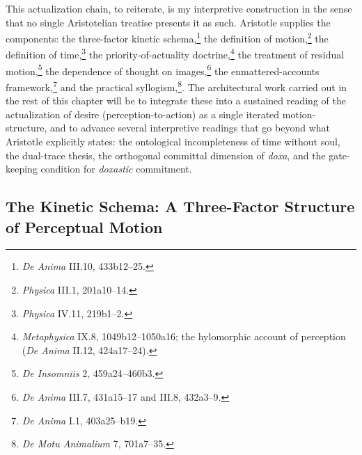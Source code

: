 \documentclass{article}
\begin{document}
This actualization chain, to reiterate, is my interpretive construction in the sense that no single Aristotelian treatise presents it as such. Aristotle supplies the components: the three-factor kinetic schema,\footnote{\textit{De Anima} III.10, 433b12--25.} the definition of motion,\footnote{\textit{Physica} III.1, 201a10--14.} the definition of time,\footnote{\textit{Physica} IV.11, 219b1--2.} the priority-of-actuality doctrine,\footnote{\textit{Metaphysica} IX.8, 1049b12--1050a16; the hylomorphic account of perception (\textit{De Anima} II.12, 424a17--24).} the treatment of residual motion,\footnote{\textit{De Insomniis} 2, 459a24--460b3.} the dependence of thought on images,\footnote{\textit{De Anima} III.7, 431a15--17 and III.8, 432a3--9.} the enmattered-accounts framework,\footnote{\textit{De Anima} I.1, 403a25--b19.} and the practical syllogism,\footnote{\textit{De Motu Animalium} 7, 701a7--35.}. The architectural work carried out in the rest of this chapter will be to integrate these into a sustained reading of the actualization of desire (perception-to-action) as a single iterated motion-structure, and to advance several interpretive readings that go beyond what Aristotle explicitly states: the ontological incompleteness of time without soul, the dual-trace thesis, the orthogonal committal dimension of \textit{doxa}, and the gate-keeping condition for \textit{doxastic} commitment. 

\subsection{The Kinetic Schema: A Three-Factor Structure of Perceptual Motion}
\end{document}
